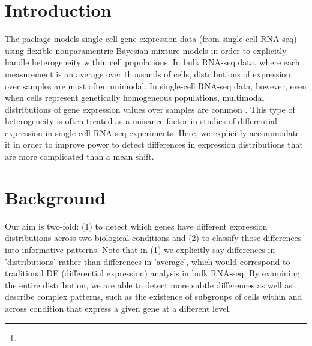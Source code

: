 \documentclass{article}
\author{Keegan Korthauer\footnote{\email{keegan@jimmy.harvard.edu}}}
\begin{document}


\maketitle
\tableofcontents



\section{Introduction}

The  package models single-cell gene expression data (from single-cell RNA-seq) using flexible nonparamentric Bayesian mixture models in order to explicitly handle heterogeneity within cell populations.  In bulk RNA-seq data, where each measurement is an average over thousands of cells, distributions of expression over samples are most often unimodal.  In single-cell RNA-seq data, however, even when cells represent genetically homogeneous populations, multimodal distributions of gene expression values over samples are common \cite{korthauer2015}.  This type of heterogeneity is often treated as a nuisance factor in studies of differential expression in single-cell RNA-seq experiments.  Here, we explicitly accommodate it in order to improve power to detect differences in expression distributions that are more complicated than a mean shift.

\section{Background}

Our aim is two-fold: (1) to detect which genes have different expression distributions across two biological conditions and (2) to classify those differences into informative patterns.  Note that in (1) we explicitly say differences in 'distributions' rather than differences in 'average', which would correspond to traditional DE (differential expression) analysis in bulk RNA-seq.  By examining the entire distribution, we are able to detect more subtle differences as well as describe complex patterns, such as the existence of subgroups of cells within and across condition that express a given gene at a different level.
\end{document}
